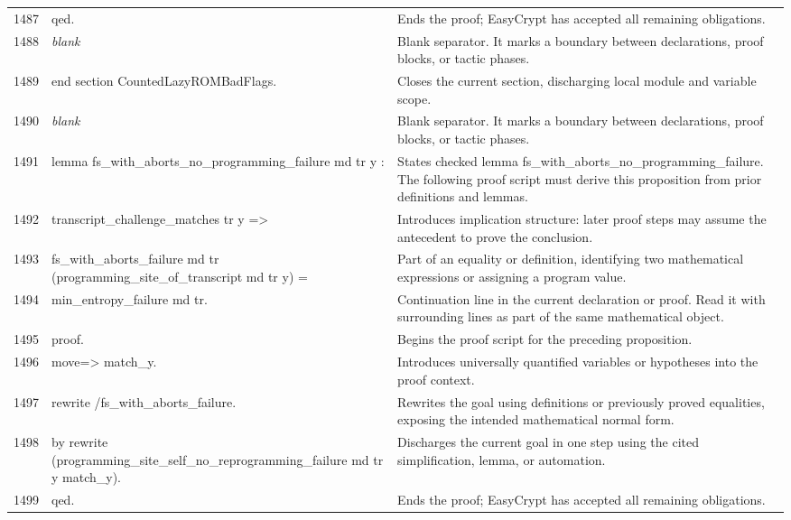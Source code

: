 \documentclass[10pt]{article}
\begin{document}
\begin{longtable}{r L{0.53\textwidth} L{0.37\textwidth}}
1487 & {\ttfamily\scriptsize qed.} & Ends the proof; EasyCrypt has accepted all remaining obligations. \\
1488 & {\ttfamily\scriptsize \emph{blank}} & Blank separator.  It marks a boundary between declarations, proof blocks, or tactic phases. \\
1489 & {\ttfamily\scriptsize end section CountedLazyROMBadFlags.} & Closes the current section, discharging local module and variable scope. \\
1490 & {\ttfamily\scriptsize \emph{blank}} & Blank separator.  It marks a boundary between declarations, proof blocks, or tactic phases. \\
1491 & {\ttfamily\scriptsize lemma fs\_with\_aborts\_no\_programming\_failure md tr y :} & States checked lemma fs\_with\_aborts\_no\_programming\_failure.  The following proof script must derive this proposition from prior definitions and lemmas. \\
1492 & {\ttfamily\scriptsize   transcript\_challenge\_matches tr y =>} & Introduces implication structure: later proof steps may assume the antecedent to prove the conclusion. \\
1493 & {\ttfamily\scriptsize   fs\_with\_aborts\_failure md tr (programming\_site\_of\_transcript md tr y) =} & Part of an equality or definition, identifying two mathematical expressions or assigning a program value. \\
1494 & {\ttfamily\scriptsize   min\_entropy\_failure md tr.} & Continuation line in the current declaration or proof.  Read it with surrounding lines as part of the same mathematical object. \\
1495 & {\ttfamily\scriptsize proof.} & Begins the proof script for the preceding proposition. \\
1496 & {\ttfamily\scriptsize move=> match\_y.} & Introduces universally quantified variables or hypotheses into the proof context. \\
1497 & {\ttfamily\scriptsize rewrite /fs\_with\_aborts\_failure.} & Rewrites the goal using definitions or previously proved equalities, exposing the intended mathematical normal form. \\
1498 & {\ttfamily\scriptsize by rewrite (programming\_site\_self\_no\_reprogramming\_failure md tr y match\_y).} & Discharges the current goal in one step using the cited simplification, lemma, or automation. \\
1499 & {\ttfamily\scriptsize qed.} & Ends the proof; EasyCrypt has accepted all remaining obligations. \\

\end{longtable}
\end{document}
